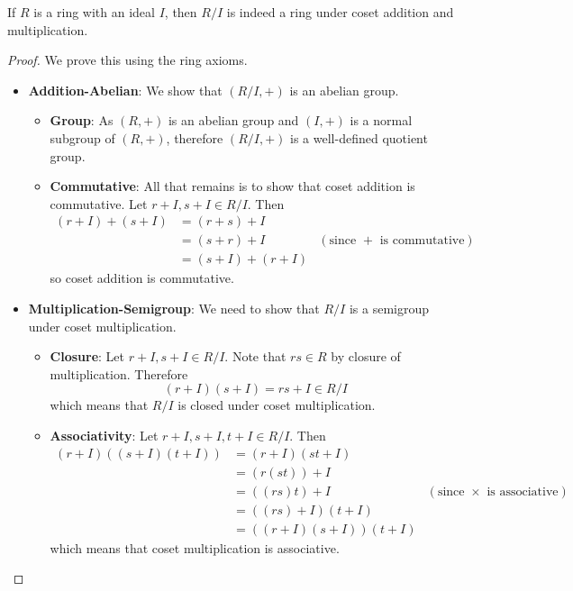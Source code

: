 \begin{proposition}
    If $R$ is a ring with an ideal $I$, then $R/I$ is indeed a ring under coset addition and multiplication.
\end{proposition}
\begin{proof}
    We prove this using the ring axioms.
    \begin{itemize}
        \item \textbf{Addition-Abelian}: We show that $(R/I,+)$ is an abelian group.
        \begin{itemize}
            \item \textbf{Group}: As $(R,+)$ is an abelian group and $(I,+)$ is a normal subgroup of $(R,+)$, therefore $(R/I,+)$ is a well-defined quotient group.
            \item \textbf{Commutative}: All that remains is to show that coset addition is commutative. Let $r+I, s+I \in R/I$. Then
            \begin{align*}
                (r+I) + (s+I) &= (r+s)+I\\
                &= (s+r) + I & (\text{since } + \text{ is commutative})\\
                &= (s+I) + (r+I)
            \end{align*}
            so coset addition is commutative.
        \end{itemize}
        \item \textbf{Multiplication-Semigroup}: We need to show that $R/I$ is a semigroup under coset multiplication.
        \begin{itemize}
            \item \textbf{Closure}: Let $r+I, s+I \in R/I$. Note that $rs \in R$ by closure of multiplication. Therefore
            \[
                (r+I)(s+I) = rs+I \in R/I
            \]
            which means that $R/I$ is closed under coset multiplication.

            \item \textbf{Associativity}: Let $r+I, s+I, t+I \in R/I$. Then
            \begin{align*}
                (r+I)((s+I)(t+I)) &= (r+I)(st+I)\\
                &= (r(st))+I\\
                &= ((rs)t) + I & (\text{since } \times \text{ is associative})\\
                &= ((rs)+I)(t+I)\\
                &= ((r+I)(s+I))(t+I)
            \end{align*}
            which means that coset multiplication is associative.


\end{itemize}
\end{itemize}
\end{proof}
